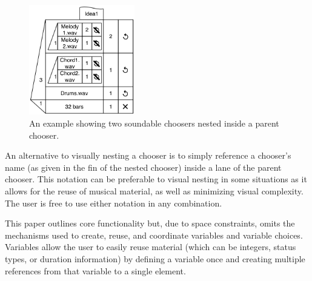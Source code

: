 \documentclass[runningheads,a4paper]{llncs}
\begin{document}

\begin{figure}
	\centering
	\includegraphics[height=4.8cm]{images/nesting.png}
	\caption{An example showing two soundable choosers nested
				inside a parent chooser.}\label{fig:nesting}
\end{figure}

An alternative to visually nesting a chooser is to simply reference a chooser's name (as given in the fin of the nested chooser) inside a lane of the parent chooser. This notation can be preferable to visual nesting in some situations as it allows for the reuse of musical material, as well as minimizing visual complexity. The user is free to use either notation in any combination.

This paper outlines core functionality but, due to space constraints, omits the mechanisms used to create, reuse, and coordinate variables and variable choices. Variables allow the user to easily reuse material (which can be integers, status types, or duration information) by defining a variable once and creating multiple references from that variable to a single element.



 
\end{document}
